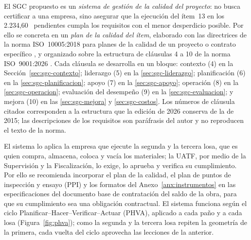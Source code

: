El SGC propuesto es un \emph{sistema de gestión de la calidad del proyecto}: no busca certificar a una empresa, sino asegurar que la ejecución del ítem~13 en los 2.234,60~\mdos{} pendientes cumpla los requisitos con el menor desperdicio posible. Por ello se concreta en un \emph{plan de la calidad del ítem}, elaborado con las directrices de la norma ISO~10005:2018 para planes de la calidad de un proyecto o contrato específico \parencite{iso10005_2018}, y organizado sobre la estructura de cláusulas 4 a 10 de la norma ISO~9001:2026 \parencite{iso9001_2026}. Cada cláusula se desarrolla en un bloque: contexto (4) en la Sección~\ref{sec:sgc-contexto}; liderazgo (5) en la \ref{sec:sgc-liderazgo}; planificación (6) en la \ref{sec:sgc-planificacion}; apoyo (7) en la \ref{sec:sgc-apoyo}; operación (8) en la \ref{sec:sgc-operacion}; evaluación del desempeño (9) en la \ref{sec:sgc-evaluacion}; y mejora (10) en las \ref{sec:sgc-mejora} y \ref{sec:sgc-costos}. Los números de cláusula citados corresponden a la estructura que la edición de 2026 conserva de la de 2015; las descripciones de los requisitos son paráfrasis del autor y no reproducen el texto de la norma. 

El sistema lo aplica la empresa que ejecute la segunda y la tercera losa, que es quien compra, almacena, coloca y vacía los materiales; la UATF, por medio de la Supervisión y la Fiscalización, lo exige, lo aprueba y verifica su cumplimiento. Por ello se recomienda incorporar el plan de la calidad, el plan de puntos de inspección y ensayo (PPI) y los formatos del Anexo~\ref{anx:instrumentos} en las especificaciones del documento base de contratación del saldo de la obra, para que su cumplimiento sea una obligación contractual. El sistema funciona según el ciclo Planificar--Hacer--Verificar--Actuar (PHVA), aplicado a cada paño y a cada losa (Figura~\ref{fig:phva}); como la segunda y la tercera losa repiten la geometría de la primera, cada vuelta del ciclo aprovecha las lecciones de la anterior.


